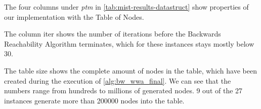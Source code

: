 The four columns under \textit{ptm} in \autoref{tab:mist-results-datastruct} show properties of our implementation with the Table of Nodes.

The column iter shows the number of iterations before the Backwards Reachability Algorithm terminates, which for these instances stays mostly below 30.

The table size shows the complete amount of nodes in the table, which have been created during the execution of \autoref{alg:bw_wwa_final}. We can see that the numbers range from hundreds to millions of generated nodes. 9 out of the 27 instances generate more than 200000 nodes into the table.

\begin{table}[H]
\centering
{}
\end{table}
